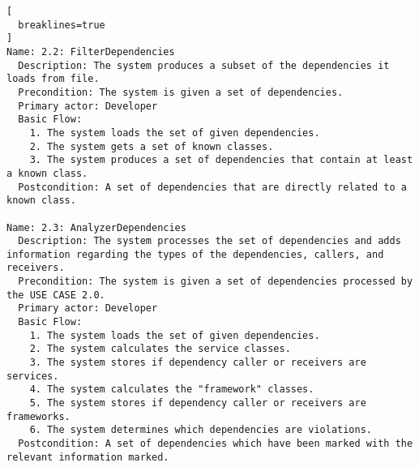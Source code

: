 \begin{lstlisting}[
  breaklines=true
]
Name: 2.2: FilterDependencies
  Description: The system produces a subset of the dependencies it loads from file.
  Precondition: The system is given a set of dependencies.
  Primary actor: Developer
  Basic Flow:
    1. The system loads the set of given dependencies.
    2. The system gets a set of known classes.
    3. The system produces a set of dependencies that contain at least a known class.
  Postcondition: A set of dependencies that are directly related to a known class. 

Name: 2.3: AnalyzerDependencies
  Description: The system processes the set of dependencies and adds information regarding the types of the dependencies, callers, and receivers.
  Precondition: The system is given a set of dependencies processed by the USE CASE 2.0.
  Primary actor: Developer
  Basic Flow:
    1. The system loads the set of given dependencies.
    2. The system calculates the service classes.
    3. The system stores if dependency caller or receivers are services.
    4. The system calculates the "framework" classes.
    5. The system stores if dependency caller or receivers are frameworks.
    6. The system determines which dependencies are violations.
  Postcondition: A set of dependencies which have been marked with the relevant information marked.
\end{lstlisting}
